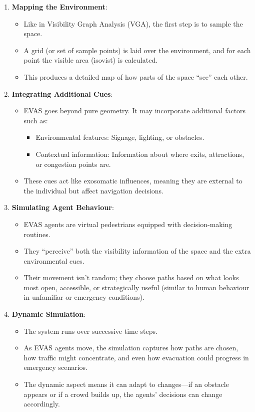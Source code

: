 \documentclass[a4paper, openany]{book}
\begin{document}
\begin{enumerate}
  \item \textbf{Mapping the Environment}:
  \begin{itemize}
    \item Like in Visibility Graph Analysis (VGA), the first step is to sample the space.
    \item A grid (or set of sample points) is laid over the environment, and for each point the visible area (isovist) is calculated.
    \item This produces a detailed map of how parts of the space ``see'' each other.
  \end{itemize}
  \item \textbf{Integrating Additional Cues}:
  \begin{itemize}
    \item EVAS goes beyond pure geometry. It may incorporate additional factors such as:
    \begin{itemize}
      \item Environmental features: Signage, lighting, or obstacles.
      \item Contextual information: Information about where exits, attractions, or congestion points are.
    \end{itemize}
    \item These cues act like exosomatic influences, meaning they are external to the individual but affect navigation decisions.
  \end{itemize}
  \item \textbf{Simulating Agent Behaviour}:
  \begin{itemize}
    \item EVAS agents are virtual pedestrians equipped with decision-making routines.
    \item They ``perceive'' both the visibility information of the space and the extra environmental cues.
    \item Their movement isn't random; they choose paths based on what looks most open, accessible, or strategically useful (similar to human behaviour in unfamiliar or emergency conditions).
  \end{itemize}
  \item \textbf{Dynamic Simulation}:
  \begin{itemize}
    \item The system runs over successive time steps.
    \item As EVAS agents move, the simulation captures how paths are chosen, how traffic might concentrate, and even how evacuation could progress in emergency scenarios.
    \item The dynamic aspect means it can adapt to changes—if an obstacle appears or if a crowd builds up, the agents' decisions can change accordingly.
  \end{itemize}
\end{enumerate}
\end{document}
